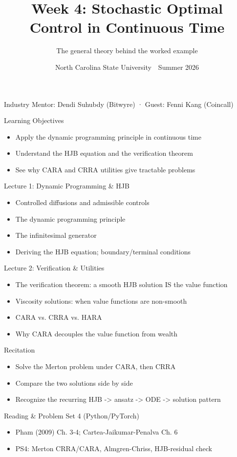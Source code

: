 \documentclass[aspectratio=169,11pt]{beamer}
\title{Week 4: Stochastic Optimal Control in Continuous Time}
\subtitle{The general theory behind the worked example}
\date{North Carolina State University \,\textbar\, Summer 2026}
\begin{document}
\begin{frame}[plain]\titlepage
\begin{center}\tiny Industry Mentor: Dendi Suhubdy (Bitwyre)  ·  Guest: Fenni Kang (Coincall)\end{center}\end{frame}
\begin{frame}{Learning Objectives}
\begin{itemize}
  \item Apply the dynamic programming principle in continuous time
  \item Understand the HJB equation and the verification theorem
  \item See why CARA and CRRA utilities give tractable problems
\end{itemize}\end{frame}
\begin{frame}{Lecture 1: Dynamic Programming \& HJB}
\begin{itemize}
  \item Controlled diffusions and admissible controls
  \item The dynamic programming principle
  \item The infinitesimal generator
  \item Deriving the HJB equation; boundary/terminal conditions
\end{itemize}\end{frame}
\begin{frame}{Lecture 2: Verification \& Utilities}
\begin{itemize}
  \item The verification theorem: a smooth HJB solution IS the value function
  \item Viscosity solutions: when value functions are non-smooth
  \item CARA vs. CRRA vs. HARA
  \item Why CARA decouples the value function from wealth
\end{itemize}\end{frame}
\begin{frame}{Recitation}
\begin{itemize}
  \item Solve the Merton problem under CARA, then CRRA
  \item Compare the two solutions side by side
  \item Recognize the recurring HJB -\textgreater{} ansatz -\textgreater{} ODE -\textgreater{} solution pattern
\end{itemize}\end{frame}
\begin{frame}{Reading \& Problem Set 4 (Python/PyTorch)}
\begin{itemize}
  \item Pham (2009) Ch. 3-4; Cartea-Jaikumar-Penalva Ch. 6
  \item PS4: Merton CRRA/CARA, Almgren-Chriss, HJB-residual check
\end{itemize}\end{frame}
\end{document}
